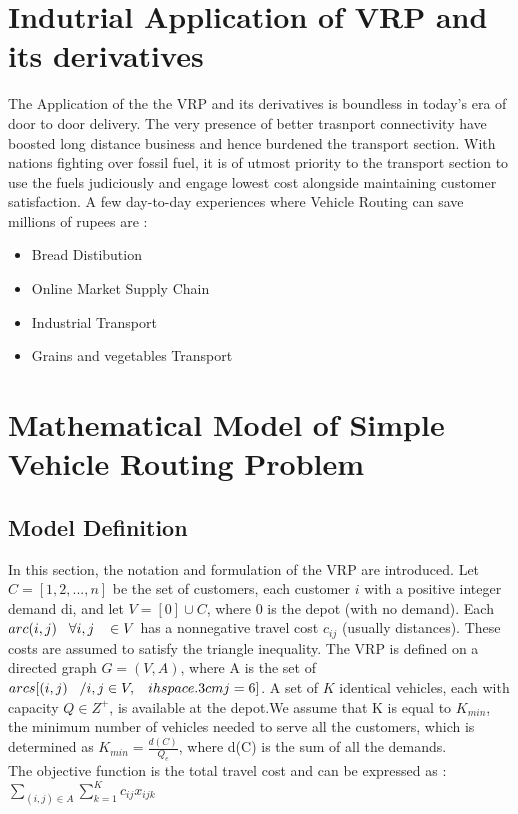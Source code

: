 \documentclass[11pt,fleqn]{book} %
\begin{document}
\section{Indutrial Application of VRP and its derivatives}
The Application of the the VRP and its derivatives is boundless in today's era of door to door delivery. The very presence of better trasnport connectivity have boosted long distance business and hence burdened the transport section. With nations fighting over fossil fuel, it is of utmost priority to the transport section to use the fuels judiciously and engage lowest cost alongside maintaining customer satisfaction. A few day-to-day experiences where Vehicle Routing can save millions of rupees are :

\begin{itemize}

\item Bread Distibution
\item Online Market Supply Chain
\item Industrial Transport
\item Grains and vegetables Transport

\end{itemize}

\newpage

\section{Mathematical Model of Simple Vehicle Routing Problem}

\subsection{Model Definition}
In this section, the notation and formulation of the VRP are introduced. Let \(C = [1, 2, . . . , n]\) be the set of customers, each customer \(i\) with a positive integer demand
d{i}, and let \(V = [0] \cup C\), where 0 is the depot (with no demand). Each
\(arc (i, j) \hspace{.3cm} \forall  i, j \hspace{.3cm} \in  V\) has a nonnegative travel cost $c_{ij}$ (usually distances). These costs are assumed to satisfy the triangle inequality. The VRP is defined on a directed graph \(G = (V, A)\), where A is the set of \(arcs [(i, j) \hspace{.3cm}/ i, j \in V,\hspace{.3cm} i hspace{.3cm}j = 6]\). A set of \(K\) identical vehicles, each with capacity \(Q \in Z^{+}\),  is available at the depot.We assume that K is equal to \(K_{min}\), the minimum number of vehicles needed to
serve all the customers, which is determined as \(K_{min} = \frac{d(C)}{Q_{e}}\), where d(C) is
the sum of all the demands.\\
\vspace*{.5cm}
The objective function is the total travel cost and can be expressed as :\\
\hspace*{5cm} \(\sum\limits_{(i,j) \in A} \sum\limits_{k=1}^{K} c_{ij}x_{ijk}\)\\
\end{document}
